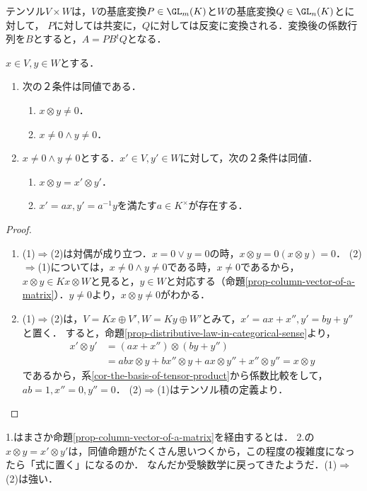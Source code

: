 \documentclass[uplatex, dvipdfmx]{jsreport}
\begin{document}
\begin{tcolorbox}[colframe=ForestGreen, colback=ForestGreen!10!white, breakable ,colbacktitle=ForestGreen!40!white, coltitle=black,fonttitle=\bfseries\sffamily,
    title=テンソルの変換]
    テンソル$V\times W$は，$V$の基底変換$P\in\GL_m(K)$と$W$の基底変換$Q\in\GL_n(K)$とに対して，
    $P$に対しては共変に，$Q$に対しては反変に変換される．変換後の係数行列を$B$とすると，$A=PB{}^t\!Q$となる．
\end{tcolorbox}

\begin{proposition}[元の間の対応の研究]\label{prop-tensors}
    $x\in V,y\in W$とする．
    \begin{enumerate}
        \item 次の２条件は同値である．
        \begin{enumerate}[(1)]
            \item $x\otimes y\ne 0$．
            \item $x\ne 0\land y\ne 0$．
        \end{enumerate}
        \item $x\ne 0\land y\ne 0$とする．$x'\in V,y'\in W$に対して，次の２条件は同値．
        \begin{enumerate}[(1)]
            \item $x\otimes y=x'\otimes y'$．
            \item $x'=ax,y'=a^{-1}y$を満たす$a\in K^\times$が存在する．
        \end{enumerate}
    \end{enumerate}
\end{proposition}
\begin{proof}\mbox{}
    \begin{enumerate}
        \item (1)$\Rightarrow$(2)は対偶が成り立つ．$x=0\lor y=0$の時，$x\otimes y=0(x\otimes y)=0$．
        (2)$\Rightarrow$(1)については，$x\ne 0\land y\ne 0$である時，$x\ne 0$であるから，$x\otimes y\in Kx\otimes W$と見ると，$y\in W$と対応する（命題\ref{prop-column-vector-of-a-matrix}）．$y\ne 0$より，$x\otimes y\ne 0$がわかる．
        \item (1)$\Rightarrow$(2)は，$V=Kx\oplus V',W=Ky\oplus W'$とみて，$x'=ax+x'',y'=by+y''$と置く．
        すると，命題\ref{prop-distributive-law-in-categorical-sense}より，
        \begin{align*}
            x'\otimes y'&=(ax+x'')\otimes(by+y'')\\
            &=abx\otimes y+bx''\otimes y+ax\otimes y''+x''\otimes y''=x\otimes y
        \end{align*}
        であるから，系\ref{cor-the-basis-of-tensor-product}から係数比較をして，$ab=1,x''=0,y''=0$．
        (2)$\Rightarrow$(1)はテンソル積の定義より．
    \end{enumerate}
\end{proof}
\begin{remarks}
    1.はまさか命題\ref{prop-column-vector-of-a-matrix}を経由するとは．
    2.の$x\otimes y=x'\otimes y'$は，同値命題がたくさん思いつくから，この程度の複雑度になったら「式に置く」になるのか．
    なんだか受験数学に戻ってきたようだ．(1)$\Rightarrow$(2)は強い．
\end{remarks}
\end{document}
